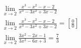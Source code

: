 \begin{ex}
\begin{align}
&\lim_{x\rightarrow 2} \frac{x^3-x^2-x-2}{x^3-3x^2+3x-2}\nonumber\\
&\lim_{x\rightarrow 2} \frac{x^3-x^2-x-2}{x^3-3x^2+3x-2}=\left[\frac{0}{0}\right]\nonumber\\
&\lim_{x\rightarrow 2} \frac{3x^2-2x-1}{3x^2-6x+3}=\frac{7}{3}\nonumber
\end{align}
\end{ex}